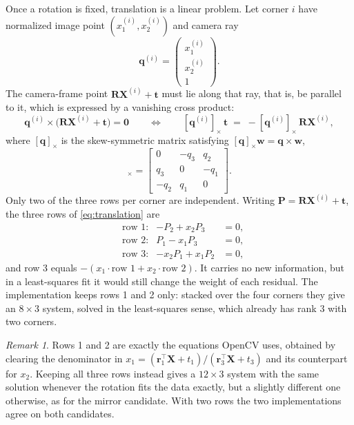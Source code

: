 \documentclass[11pt,a4paper]{article}
\theoremstyle{remark}
\newtheorem*{remark}{Remark}
\newcommand{\Rmat}{\mathbf{R}}
\newcommand{\Pvec}{\mathbf{P}}
\newcommand{\qvec}{\mathbf{q}}
\newcommand{\rvec}{\mathbf{r}}
\newcommand{\tvec}{\mathbf{t}}
\newcommand{\wvec}{\mathbf{w}}
\newcommand{\Xvec}{\mathbf{X}}
\newcommand{\zerovec}{\mathbf{0}}
\newcommand{\skewm}[1]{[#1]_{\times}}
\begin{document}
Once a rotation is fixed, translation is a linear problem. Let corner $i$ have
normalized image point $(x_1^{(i)}, x_2^{(i)})$ and camera ray
\begin{equation}
  \qvec^{(i)} =
  \begin{pmatrix} x_1^{(i)} \\ x_2^{(i)} \\ 1 \end{pmatrix}.
\end{equation}
The camera-frame point $\Rmat\Xvec^{(i)} + \tvec$ must lie along that ray, that
is, be parallel to it, which is expressed by a vanishing cross product:
\begin{equation}
  \qvec^{(i)} \times \big(\Rmat\Xvec^{(i)} + \tvec\big) = \zerovec
  \qquad \Longleftrightarrow \qquad
  \skewm{\qvec^{(i)}}\,\tvec
  \;=\; -\skewm{\qvec^{(i)}}\,\Rmat\Xvec^{(i)},
  \label{eq:translation}
\end{equation}
where $\skewm{\qvec}$ is the skew-symmetric matrix satisfying
$\skewm{\qvec}\wvec = \qvec \times \wvec$,
\begin{equation}
  \skewm{\qvec} =
  \begin{bmatrix}
    0 & -q_3 & q_2 \\
    q_3 & 0 & -q_1 \\
    -q_2 & q_1 & 0
  \end{bmatrix}.
\end{equation}
Only two of the three rows per corner are independent. Writing
$\Pvec = \Rmat\Xvec^{(i)} + \tvec$, the three rows of \eqref{eq:translation} are
\begin{align}
  &\text{row 1:} & -P_2 + x_2 P_3 &= 0, \\
  &\text{row 2:} & P_1 - x_1 P_3 &= 0, \\
  &\text{row 3:} & -x_2 P_1 + x_1 P_2 &= 0,
\end{align}
and row 3 equals $-(x_1\cdot\text{row 1} + x_2\cdot\text{row 2})$. It carries no
new information, but in a least-squares fit it would still change the weight of
each residual. The implementation keeps rows 1 and 2 only: stacked over the four
corners they give an $8 \times 3$ system, solved in the least-squares sense,
which already has rank $3$ with two corners.

\begin{remark}
Rows 1 and 2 are exactly the equations OpenCV uses, obtained by clearing the
denominator in $x_1 = (\rvec_1^{\top}\Xvec + t_1)/(\rvec_3^{\top}\Xvec + t_3)$
and its counterpart for $x_2$. Keeping all three rows instead gives a
$12\times3$ system with the same solution whenever the rotation fits the data
exactly, but a slightly different one otherwise, as for the mirror candidate.
With two rows the two implementations agree on both candidates.
\end{remark}
\end{document}
